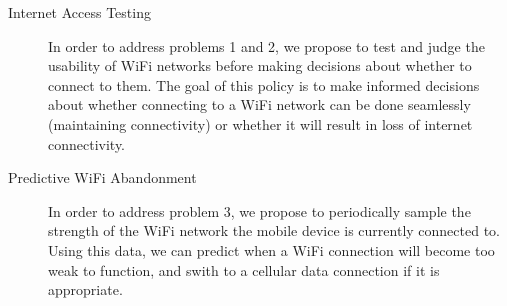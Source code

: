 \begin{description}
\item[Internet Access Testing] In order to address problems 1 and 2, we propose to test and judge the usability of WiFi networks before making decisions about whether to connect to them. The goal of this policy is to make informed decisions about whether connecting to a WiFi network can be done seamlessly (maintaining connectivity) or whether it will result in loss of internet connectivity.
\item[Predictive WiFi Abandonment] In order to address problem 3, we propose to periodically sample the strength of the WiFi network the mobile device is currently connected to. Using this data, we can predict when a WiFi connection will become too weak to function, and swith to a cellular data connection if it is appropriate.
\end{description}

